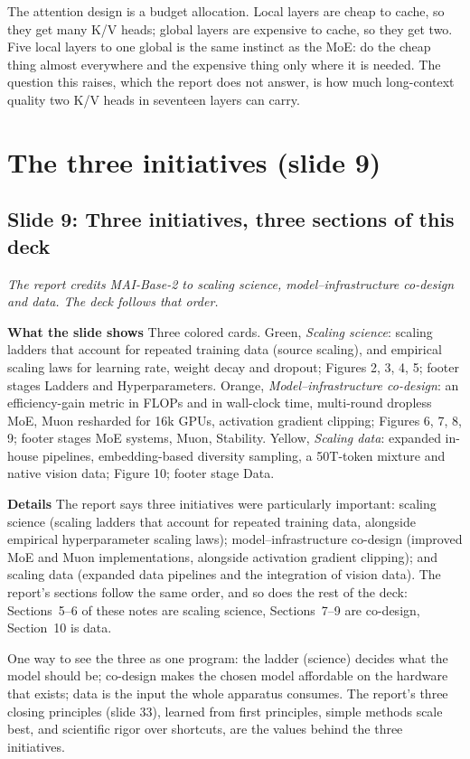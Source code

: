 \documentclass[11pt,letterpaper]{article}
\newcommand{\setstage}[1]{\colorlet{stagec}{#1}}
\newcommand{\slide}[3]{%
  \subsection[Slide #1: #2]{Slide #1: #2}%
  {\color{muted}\itshape #3\par}\medskip}
\newcommand{\para}[1]{\medskip\noindent\textbf{#1}\quad}
\newenvironment{intuition}{\begin{tcolorbox}[intuitionbox]}{\end{tcolorbox}}
\begin{document}
\begin{intuition}
The attention design is a budget allocation. Local layers are cheap to cache, so they get many K/V heads; global layers are expensive to cache, so they get two. Five local layers to one global is the same instinct as the MoE: do the cheap thing almost everywhere and the expensive thing only where it is needed. The question this raises, which the report does not answer, is how much long-context quality two K/V heads in seventeen layers can carry.
\end{intuition}

\setstage{ink}
\section{The three initiatives (slide 9)}

\slide{9}{Three initiatives, three sections of this deck}{The report credits MAI-Base-2 to scaling science, model--infrastructure co-design and data. The deck follows that order.}

\para{What the slide shows} Three colored cards. Green, \emph{Scaling science}: scaling ladders that account for repeated training data (source scaling), and empirical scaling laws for learning rate, weight decay and dropout; Figures 2, 3, 4, 5; footer stages Ladders and Hyperparameters. Orange, \emph{Model--infrastructure co-design}: an efficiency-gain metric in FLOPs and in wall-clock time, multi-round dropless MoE, Muon resharded for 16k GPUs, activation gradient clipping; Figures 6, 7, 8, 9; footer stages MoE systems, Muon, Stability. Yellow, \emph{Scaling data}: expanded in-house pipelines, embedding-based diversity sampling, a 50T-token mixture and native vision data; Figure 10; footer stage Data.

\para{Details} The report says three initiatives were particularly important: scaling science (scaling ladders that account for repeated training data, alongside empirical hyperparameter scaling laws); model--infrastructure co-design (improved MoE and Muon implementations, alongside activation gradient clipping); and scaling data (expanded data pipelines and the integration of vision data). The report's sections follow the same order, and so does the rest of the deck: Sections~5--6 of these notes are scaling science, Sections~7--9 are co-design, Section~10 is data.

One way to see the three as one program: the ladder (science) decides what the model should be; co-design makes the chosen model affordable on the hardware that exists; data is the input the whole apparatus consumes. The report's three closing principles (slide 33), learned from first principles, simple methods scale best, and scientific rigor over shortcuts, are the values behind the three initiatives.
\end{document}
